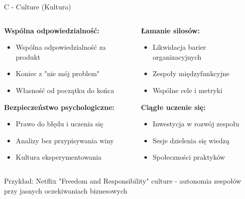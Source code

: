 \documentclass[10pt, aspectratio=169]{beamer}
\begin{document}
\begin{frame}{C - Culture (Kultura)}
\begin{columns}[T]
\begin{column}{0.5\textwidth}
\textbf{Wspólna odpowiedzialność:}
\begin{itemize}
\item Wspólna odpowiedzialność za produkt
\item Koniec z "nie mój problem"
\item Własność od początku do końca
\end{itemize}

\textbf{Bezpieczeństwo psychologiczne:}
\begin{itemize}
\item Prawo do błędu i uczenia się
\item Analizy bez przypisywania winy
\item Kultura eksperymentowania
\end{itemize}
\end{column}
\begin{column}{0.5\textwidth}
\textbf{Łamanie silosów:}
\begin{itemize}
\item Likwidacja barier organizacyjnych
\item Zespoły międzyfunkcyjne
\item Wspólne cele i metryki
\end{itemize}

\textbf{Ciągłe uczenie się:}
\begin{itemize}
\item Inwestycja w rozwój zespołu
\item Sesje dzielenia się wiedzą
\item Społeczności praktyków
\end{itemize}
\end{column}
\end{columns}

\begin{exampleblock}{Przykład: Netflix}
"Freedom and Responsibility" culture - autonomia zespołów przy jasnych oczekiwaniach biznesowych
\end{exampleblock}
\end{frame}
\end{document}
